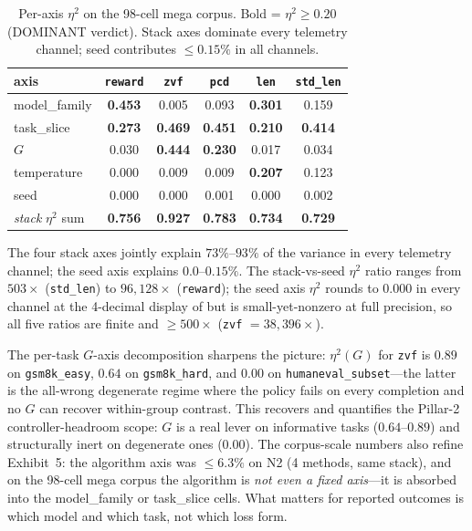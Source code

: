 \begin{table}[t]
\centering
\caption{Per-axis $\eta^{2}$ on the 98-cell mega corpus. Bold = $\eta^{2}
\ge 0.20$ (DOMINANT verdict). Stack axes dominate every telemetry channel;
seed contributes $\le 0.15\%$ in all channels.}
\label{tab:p5-mega-eta2}
\small
\begin{tabular}{@{}lccccc@{}}
\toprule
axis & \texttt{reward} & \texttt{zvf} & \texttt{pcd} & \texttt{len} & \texttt{std\_len} \\
\midrule
model\_family  & \textbf{0.453} & 0.005 & 0.093 & \textbf{0.301} & 0.159 \\
task\_slice    & \textbf{0.273} & \textbf{0.469} & \textbf{0.451} & \textbf{0.210} & \textbf{0.414} \\
$G$            & 0.030          & \textbf{0.444} & \textbf{0.230} & 0.017 & 0.034 \\
temperature    & 0.000          & 0.009 & 0.009 & \textbf{0.207} & 0.123 \\
seed           & 0.000          & 0.000 & 0.001 & 0.000 & 0.002 \\
\midrule
\emph{stack} $\eta^{2}$ sum & \textbf{0.756} & \textbf{0.927} & \textbf{0.783} & \textbf{0.734} & \textbf{0.729} \\
\bottomrule
\end{tabular}
\end{table}

The four stack axes jointly explain $73\%$--$93\%$ of the variance in every
telemetry channel; the seed axis explains $0.0$--$0.15\%$. The
stack-vs-seed $\eta^{2}$ ratio ranges from $503\times$ (\texttt{std\_len})
to $96{,}128\times$ (\texttt{reward}); the seed axis $\eta^{2}$ rounds to
$0.000$ in every channel at the 4-decimal display of
 but is small-yet-nonzero at full precision, so
all five ratios are finite and $\ge 500\times$ (\texttt{zvf} $= 38{,}396\times$).

The per-task $G$-axis decomposition sharpens the picture: $\eta^{2}(G)$
for \texttt{zvf} is $0.89$ on \texttt{gsm8k\_easy}, $0.64$ on
\texttt{gsm8k\_hard}, and $0.00$ on \texttt{humaneval\_subset}---the latter
is the all-wrong degenerate regime where the policy fails on every
completion and no $G$ can recover within-group contrast. This recovers
and quantifies the Pillar-2 controller-headroom scope: $G$ is a real lever
on informative tasks ($0.64$--$0.89$) and structurally inert on degenerate
ones ($0.00$). The corpus-scale numbers also refine Exhibit~5: the
algorithm axis was $\le 6.3\%$ on N2 (4 methods, same stack), and on the
98-cell mega corpus the algorithm is \emph{not even a fixed axis}---it
is absorbed into the model\_family or task\_slice cells. What matters for
reported outcomes is which model and which task, not which loss form.

